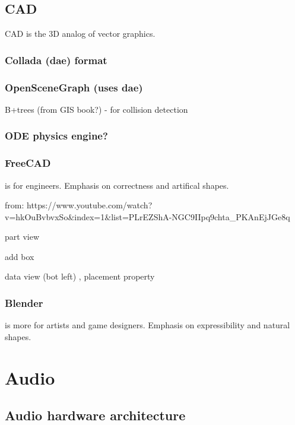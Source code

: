 \documentclass[oneside,english]{scrbook}
\begin{document}
\chapter{CAD}

CAD is the 3D analog of vector graphics.

\section{Collada (dae) format}

\section{OpenSceneGraph (uses dae)}
B+trees (from GIS book?) - for collision detection

\section{ODE physics engine?}

\section{FreeCAD}
is for engineers. Emphasis on correctness and artifical shapes.

from:
https://www.youtube.com/watch?v=hkOuBvbvxSo&index=1&list=PLrEZShA-NGC9IIpq9chta_PKAnEjJGe8q

part view

add box

data view (bot left) , placement property


\section{Blender}
is more for artists and game designers. Emphasis on expressibility and natural shapes.







\part{Audio}


\chapter{Audio hardware architecture}
\end{document}
